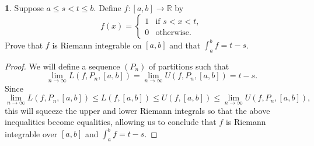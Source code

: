 \documentclass[12pt]{article}
\theoremstyle{definition}
\newtheorem{ex}{}
\begin{document}
\begin{ex}
	Suppose $a \leq s < t \leq b$.
	Define $f: [a, b] \to \mathbb{R}$ by \begin{equation*}
		f(x) = \begin{cases}
			1 & \text{if } s < x < t, \\
			0 & \text{otherwise.}
		\end{cases}
	\end{equation*}
	Prove that $f$ is Riemann integrable on $[a, b]$ and that $\int_a^b f = t - s$.
\end{ex}
\begin{proof}
	We will define a sequence $(P_n)$ of partitions such that \begin{equation*}
		\lim_{n \to \infty}L(f, P_n, [a, b]) = \lim_{n \to \infty} U(f, P_n, [a, b]) = t - s.
	\end{equation*}
	Since \begin{equation*}
		\lim_{n \to \infty}L(f, P_n, [a,b]) \leq L(f, [a, b]) \leq U(f, [a, b]) \leq \lim_{n \to \infty}U(f, P_n, [a, b]),
	\end{equation*}
	this will squeeze the upper and lower Riemann integrals so that the above inequalities become equalities, allowing us to conclude that $f$ is Riemann integrable over $[a, b]$ and $\int_a^b f = t - s$.


\end{proof}
\end{document}
